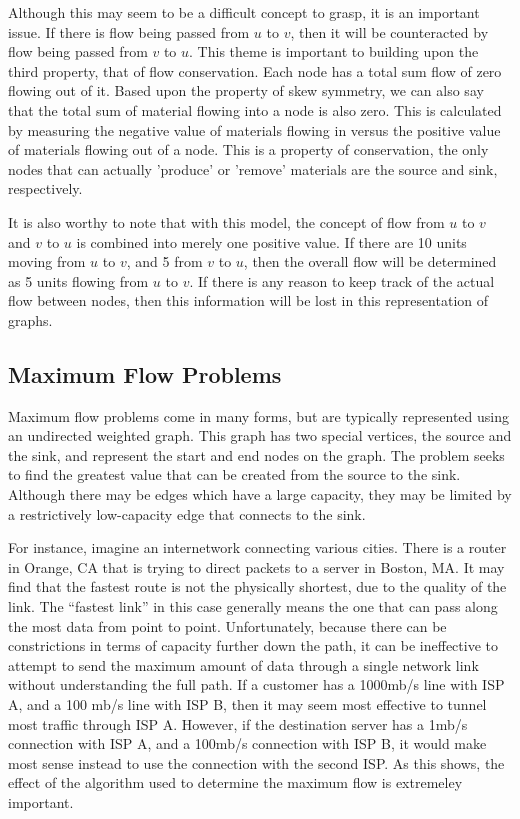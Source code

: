 \documentclass[conference]{IEEEtran}
\begin{document}
Although this may seem to be a difficult concept to grasp, it is an important issue. If there is flow being passed from $u$ to $v$, then it will be counteracted by flow being passed from $v$ to $u$. This theme is important to building upon the third property, that of flow conservation. Each node has a total sum flow of zero flowing out of it. Based upon the property of skew symmetry, we can also say that the total sum of material flowing into a node is also zero. This is calculated by measuring the negative value of materials flowing in versus the positive value of materials flowing out of a node. This is a property of conservation, the only nodes that can actually 'produce' or 'remove' materials are the source and sink, respectively.

It is also worthy to note that with this model, the concept of flow from $u$ to $v$ and $v$ to $u$ is combined into merely one positive value. If there are 10 units moving from $u$ to $v$, and 5 from $v$ to $u$, then the overall flow will be determined as 5 units flowing from $u$ to $v$. If there is any reason to keep track of the actual flow between nodes, then this information will be lost in this representation of graphs.

\subsection{Maximum Flow Problems}
Maximum flow problems come in many forms, but are typically represented using an undirected weighted graph. This graph has two special vertices, the source and the sink, and represent the start and end nodes on the graph. The problem seeks to find the greatest value that can be created from the source to the sink. Although there may be edges which have a large capacity, they may be limited by a restrictively low-capacity edge that connects to the sink.

For instance, imagine an internetwork connecting various cities. There is a router in Orange, CA that is trying to direct packets to a server in Boston, MA. It may find that the fastest route is not the physically shortest, due to the quality of the link. The ``fastest link'' in this case generally means the one that can pass along the most data from point to point. Unfortunately, because there can be constrictions in terms of capacity further down the path, it can be ineffective to attempt to send the maximum amount of data through a single network link without understanding the full path. If a customer has a 1000mb/s line with ISP A, and a 100 mb/s line with ISP B, then it may seem most effective to tunnel most traffic through ISP A. However, if the destination server has a 1mb/s connection with ISP A, and a 100mb/s connection with ISP B, it would make most sense instead to use the connection with the second ISP. As this shows, the effect of the algorithm used to determine the maximum flow is extremeley important.
\end{document}
